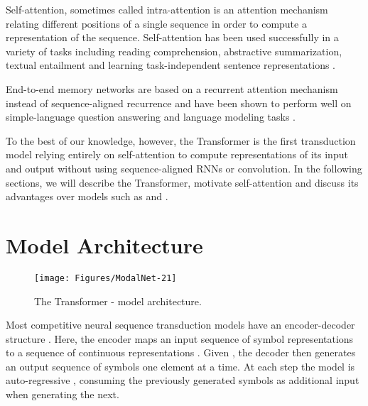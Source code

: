 \documentclass{article}
\begin{document}
Self-attention, sometimes called intra-attention is an attention mechanism relating different positions of a single sequence in order to compute a representation of the sequence. Self-attention has been used successfully in a variety of tasks including reading comprehension, abstractive summarization, textual entailment and learning task-independent sentence representations \citep{cheng2016long, decomposableAttnModel, paulus2017deep, lin2017structured}.

End-to-end memory networks are based on a recurrent attention mechanism instead of sequence-aligned recurrence and have been shown to perform well on simple-language question answering and language modeling tasks \citep{sukhbaatar2015}.

To the best of our knowledge, however, the Transformer is the first transduction model relying entirely on self-attention to compute representations of its input and output without using sequence-aligned RNNs or convolution.
In the following sections, we will describe the Transformer, motivate self-attention and discuss its advantages over models such as \citep{neural_gpu, NalBytenet2017} and \citep{JonasFaceNet2017}.


























%
 
\section{Model Architecture}

\begin{figure}
  \centering
  \texttt{[image: Figures/ModalNet-21]}
  \caption{The Transformer - model architecture.}
  \label{fig:model-arch}
\end{figure}



Most competitive neural sequence transduction models have an encoder-decoder structure \citep{cho2014learning,bahdanau2014neural,sutskever14}. Here, the encoder maps an input sequence of symbol representations  to a sequence of continuous representations . Given , the decoder then generates an output sequence  of symbols one element at a time. At each step the model is auto-regressive \citep{graves2013generating}, consuming the previously generated symbols as additional input when generating the next.
\end{document}
